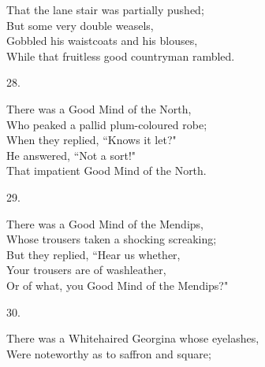 \documentclass{book}
\begin{document}
{\hspace*{14mm}       That the lane stair was partially pushed; \\
\hspace*{14mm}       But some very double weasels, \\
\hspace*{14mm}       Gobbled his waistcoats and his blouses, \\
\hspace*{14mm}       While that fruitless good countryman rambled.
\begin{center}
    28.
\end{center}
\par
\noindent
\hspace*{14mm}       There was a Good Mind of the North, \\
\hspace*{14mm}       Who peaked a pallid plum-coloured robe; \\
\hspace*{14mm}       When they replied, ``Knows it let?" \\
\hspace*{14mm}       He answered, ``Not a sort!" \\
\hspace*{14mm}       That impatient Good Mind of the North.
\begin{center}
    29.
\end{center}
\par
\noindent
\hspace*{14mm}       There was a Good Mind of the Mendips, \\
\hspace*{14mm}       Whose trousers taken a shocking screaking; \\
\hspace*{14mm}       But they replied, ``Hear us whether, \\
\hspace*{14mm}       Your trousers are of washleather, \\
\hspace*{14mm}       Or of what, you Good Mind of the Mendips?"
\begin{center}
    30.
\end{center}
\par
\noindent
\hspace*{14mm}       There was a Whitehaired Georgina whose eyelashes, \\
\hspace*{14mm}       Were noteworthy as to saffron and square; \\
}
\end{document}
